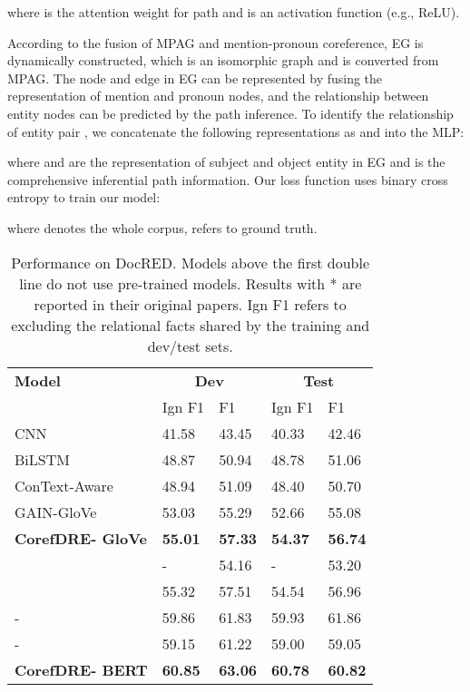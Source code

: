 \documentclass{article}
\begin{document}
where  is the attention weight for  path and  is an activation function (e.g., ReLU). 

According to the fusion of MPAG and mention-pronoun coreference, EG is dynamically constructed, which is an isomorphic graph and is converted from MPAG. The node and edge in EG can be represented by fusing the representation of mention and pronoun nodes, and the relationship between entity nodes can be predicted by the path inference. To identify the relationship of entity pair , we concatenate the following representations as  and into the MLP: 



where  and  are the representation of subject and object entity in EG and  is the comprehensive inferential path information. Our loss function uses binary cross entropy to train our model:



where  denotes the whole corpus,  refers to ground truth.
\begin{table*}[htbp]
\centering
\setlength{\belowcaptionskip}{-0.4cm}
\begin{tabular}{lllll} \toprule
\textbf{Model} & \multicolumn{2}{c}{\textbf{Dev}}&\multicolumn{2}{c}{\textbf{Test}}   \\
\cline{2-5} &    Ign F1 & F1 & Ign F1 & F1  \\
  \midrule
  CNN~\cite{yao2019docred} &  41.58 & 43.45 & 40.33 & 42.46   \\
  BiLSTM~\cite{yao2019docred} &  48.87 & 50.94 & 48.78 & 51.06   \\
  ConText-Aware~\cite{yao2019docred} &  48.94 & 51.09 & 48.40 & 50.70   \\
  GAIN-GloVe~\cite{zeng2020double} &  53.03 & 55.29 & 52.66 & 55.08   \\
  \midrule
  \textbf{CorefDRE- GloVe} &  \textbf{55.01}& \textbf{57.33} & \textbf{54.37} & \textbf{56.74}   \\
  \midrule
  \midrule
  {} ~\cite{wang2019fine} &- &54.16 &- &53.20 \\
  {} ~\cite{ye2020coreferential} & 55.32 & 57.51 & 54.54 & 56.96 \\
  {-} ~\cite{zhang2021document} & 59.86 & 61.83 & 59.93 & 61.86 \\
  {-} ~\cite{zeng2020double} & 59.15 & 61.22 & 59.00 & 59.05 \\
  \midrule 
\textbf{CorefDRE- BERT} &  \textbf{60.85}& \textbf{63.06} & \textbf{60.78} &\textbf{60.82}   \\
  \bottomrule
  \end{tabular}
  \caption{Performance on DocRED. Models above the first double line do not use pre-trained models. Results with * are reported in their original papers. Ign F1 refers to excluding the relational facts shared by the training and dev/test sets.}
  \label{tab2}
\end{table*}
\end{document}
